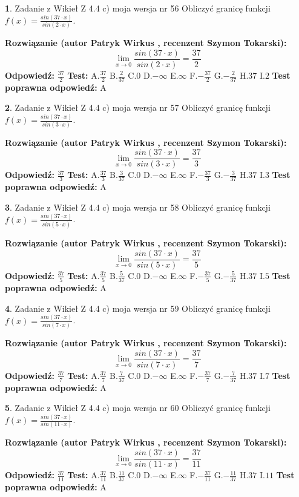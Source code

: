 \documentclass[12pt, a4paper]{article}
\theoremstyle{definition} %
\newtheorem{zad}{}
\newcommand{\zadStart}[1]{\begin{zad}#1\newline}
\newcommand{\zadStop}{\end{zad}}
\newcommand{\rozwStart}[2]{\noindent \textbf{Rozwiązanie (autor #1 , recenzent #2): }\newline}
\newcommand{\rozwStop}{\newline}
\newcommand{\odpStart}{\noindent \textbf{Odpowiedź:}\newline}
\newcommand{\odpStop}{\newline}
\newcommand{\testStart}{\noindent \textbf{Test:}\newline}
\newcommand{\testStop}{\newline}
\newcommand{\kluczStart}{\noindent \textbf{Test poprawna odpowiedź:}\newline}
\newcommand{\kluczStop}{\newline}
\begin{document}
\zadStart{Zadanie z Wikieł Z 4.4 c) moja wersja nr 56}
Obliczyć granicę funkcji $f(x)=\frac{sin(37\cdot x)}{sin(2\cdot x)}$.
\zadStop
\rozwStart{Patryk Wirkus}{Szymon Tokarski}
$$\lim\limits_{x\to 0}\frac{sin(37\cdot x)}{sin(2\cdot x)}=
\frac{37}{2}$$
\rozwStop
\odpStart
$\frac{37}{2}$
\odpStop
\testStart
A.$\frac{37}{2}$
B.$\frac{2}{37}$
C.$0$
D.$-\infty$
E.$\infty$
F.$-\frac{37}{2}$
G.$-\frac{2}{37}$
H.$37$
I.$2$
\testStop
\kluczStart
A
\kluczStop



\zadStart{Zadanie z Wikieł Z 4.4 c) moja wersja nr 57}
Obliczyć granicę funkcji $f(x)=\frac{sin(37\cdot x)}{sin(3\cdot x)}$.
\zadStop
\rozwStart{Patryk Wirkus}{Szymon Tokarski}
$$\lim\limits_{x\to 0}\frac{sin(37\cdot x)}{sin(3\cdot x)}=
\frac{37}{3}$$
\rozwStop
\odpStart
$\frac{37}{3}$
\odpStop
\testStart
A.$\frac{37}{3}$
B.$\frac{3}{37}$
C.$0$
D.$-\infty$
E.$\infty$
F.$-\frac{37}{3}$
G.$-\frac{3}{37}$
H.$37$
I.$3$
\testStop
\kluczStart
A
\kluczStop



\zadStart{Zadanie z Wikieł Z 4.4 c) moja wersja nr 58}
Obliczyć granicę funkcji $f(x)=\frac{sin(37\cdot x)}{sin(5\cdot x)}$.
\zadStop
\rozwStart{Patryk Wirkus}{Szymon Tokarski}
$$\lim\limits_{x\to 0}\frac{sin(37\cdot x)}{sin(5\cdot x)}=
\frac{37}{5}$$
\rozwStop
\odpStart
$\frac{37}{5}$
\odpStop
\testStart
A.$\frac{37}{5}$
B.$\frac{5}{37}$
C.$0$
D.$-\infty$
E.$\infty$
F.$-\frac{37}{5}$
G.$-\frac{5}{37}$
H.$37$
I.$5$
\testStop
\kluczStart
A
\kluczStop



\zadStart{Zadanie z Wikieł Z 4.4 c) moja wersja nr 59}
Obliczyć granicę funkcji $f(x)=\frac{sin(37\cdot x)}{sin(7\cdot x)}$.
\zadStop
\rozwStart{Patryk Wirkus}{Szymon Tokarski}
$$\lim\limits_{x\to 0}\frac{sin(37\cdot x)}{sin(7\cdot x)}=
\frac{37}{7}$$
\rozwStop
\odpStart
$\frac{37}{7}$
\odpStop
\testStart
A.$\frac{37}{7}$
B.$\frac{7}{37}$
C.$0$
D.$-\infty$
E.$\infty$
F.$-\frac{37}{7}$
G.$-\frac{7}{37}$
H.$37$
I.$7$
\testStop
\kluczStart
A
\kluczStop



\zadStart{Zadanie z Wikieł Z 4.4 c) moja wersja nr 60}
Obliczyć granicę funkcji $f(x)=\frac{sin(37\cdot x)}{sin(11\cdot x)}$.
\zadStop
\rozwStart{Patryk Wirkus}{Szymon Tokarski}
$$\lim\limits_{x\to 0}\frac{sin(37\cdot x)}{sin(11\cdot x)}=
\frac{37}{11}$$
\rozwStop
\odpStart
$\frac{37}{11}$
\odpStop
\testStart
A.$\frac{37}{11}$
B.$\frac{11}{37}$
C.$0$
D.$-\infty$
E.$\infty$
F.$-\frac{37}{11}$
G.$-\frac{11}{37}$
H.$37$
I.$11$
\testStop
\kluczStart
A
\kluczStop
\end{document}
